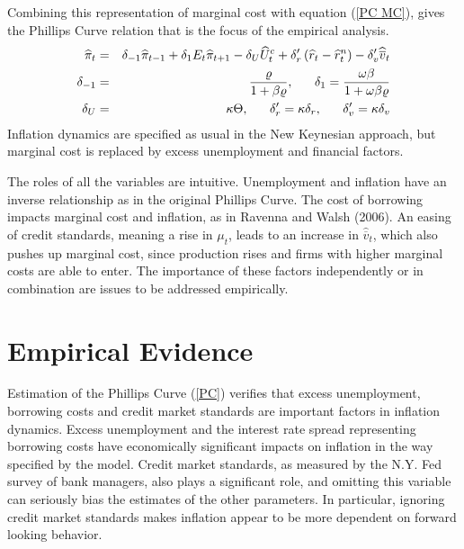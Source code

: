 \documentclass{article}
\begin{document}
Combining this representation of marginal cost with equation (\ref{PC MC}),
gives the Phillips Curve relation that is the focus of the empirical
analysis.
\begin{eqnarray}
\widehat{\pi }_{t} &=&\delta _{-1}\widehat{\pi }_{t-1}+\delta _{1}E_{t}%
\widehat{\pi }_{t+1}-\delta _{U}\widehat{U}_{t}^{c}+\delta _{r}^{\prime
}\left( \widehat{r}_{t}-\widehat{r}_{t}^{n}\right) -\delta _{v}^{\prime }%
\widehat{\overline{v}}_{t}  \label{PC} \\
\delta _{-1} &=&\frac{\varrho }{1+\beta \varrho },\text{ \ \ \ \ }\delta
_{1}=\frac{\omega \beta }{1+\omega \beta \varrho }  \notag \\
\delta _{U} &=&\kappa \Theta ,\text{ \ \ \ \ }\delta _{r}^{\prime }=\kappa
\delta _{r},\text{ \ \ \ \ }\delta _{v}^{\prime }=\kappa \delta _{v}  \notag
\end{eqnarray}
Inflation dynamics are specified as usual in the New Keynesian approach, but
marginal cost is replaced by excess unemployment and financial factors.

The roles of all the variables are intuitive. Unemployment and inflation
have an inverse relationship as in the original Phillips Curve. The cost
of borrowing impacts marginal cost and inflation, as in Ravenna and Walsh
(2006). An easing of credit standards, meaning a rise in $\mu _{t}$, leads
to an increase in $\widehat{\overline{v}}_{t}$, which also pushes up
marginal cost, since production rises and firms with higher marginal costs
are able to enter. The importance of these factors independently or in
combination are issues to be addressed empirically.

\section{Empirical Evidence}

Estimation of the Phillips Curve (\ref{PC}) verifies that excess
unemployment, borrowing costs and credit market standards are important
factors in inflation dynamics. Excess unemployment and the interest rate
spread representing borrowing costs have economically significant impacts on
inflation in the way specified by the model. Credit market standards, as
measured by the N.Y. Fed survey of bank managers, also plays a significant
role, and omitting this variable can seriously bias the estimates of the
other parameters. In particular, ignoring credit market standards makes
inflation appear to be more dependent on forward looking behavior.
\end{document}
